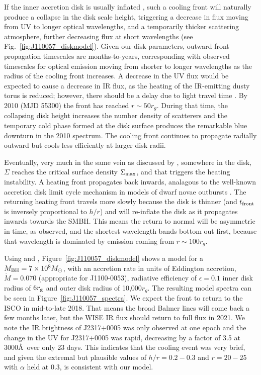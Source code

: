 \documentclass[a4paper,fleqn,usenatbib]{mnras}
\begin{document}
If the inner accretion disk is usually inflated \citet[see e.g.,
][]{Sirko_Goodman2003, Thompson2005, Hopkins_Quataert2011}, such a
cooling front will naturally produce a collapse in the disk scale
height, triggering a decrease in flux moving from UV to longer optical
wavelengths, and a temporarily thicker scattering atmosphere, further
decreasing flux at short wavelengths (see
Fig.~\ref{fig:J110057_diskmodel}).  Given our disk parameters, outward
front propagation timescales are months-to-years, corresponding with
observed timescales for optical emission moving from shorter to longer
wavelengths as the radius of the cooling front increases. A decrease
in the UV flux would be expected to cause a decrease in IR flux, as
the heating of the IR-emitting dusty torus is reduced; however, there
should be a delay due to light travel time \citet[e.g.,
][]{Jun2015}. By 2010 (MJD 55300) the front has reached $r\sim50
r_{g}$. During that time, the collapsing disk height increases the
number density of scatterers and the temporary cold phase formed at
the disk surface produces the remarkable blue downturn in the 2010
spectrum. The cooling front continues to propagate radially outward
but cools less efficiently at larger disk radii.

Eventually, very much in the same vein as discussed by
\citet{Hameury2009}, somewhere in the disk, $\Sigma$ reaches the
critical surface density $\Sigma_{\rm max}$, and that triggers the
heating instability. A heating front propagates back inwards,
analagous to the well-known accretion disk limit cycle mechanism in
models of dwarf novae outbursts \citep[e.g.,][]{Cannizzo1998}. The
returning heating front travels more slowly because the disk is
thinner (and $t_{\rm front}$ is inversely proportional to $h/r$) and
will re-inflate the disk as it propagates inwards towards the
SMBH. This means the return to normal will be asymmetric in time, as
observed, and the shortest wavelength bands bottom out first, because
that wavelength is dominated by emission coming from $r\sim100r_{g}$.

Using \citet{Ford2018} and \citet{Sirko_Goodman2003},
Figure~\ref{fig:J110057_diskmodel} shows a model for a $M_{\rm
BH}=7\times 10^{8} M_{\odot}$, with an accretion rate in units of
Eddington accretion, $\dot{M}=0.070$ (appropriate for J1100-0053),
radiative efficiency of $\epsilon=0.1$ inner disk radius of $6r_{\rm
g}$ and outer disk radius of 10,000$r_{g}$. The resulting model
spectra can be seen in Figure~\ref{fig:J110057_spectra}. We expect the
front to return to the ISCO in mid-to-late 2018. That means the broad
Balmer lines will come back a few months later, but the WISE IR flux
should return to full flux in 2021. We note the IR brightness of
J2317+0005 was only observed at one epoch and the change in the UV for
J2317+0005 was rapid, decreasing by a factor of 3.5 at 3000\AA\ over
only 23 days. This indicates that the cooling event was very brief,
and given the extremal but plausible values of $h/r = 0.2-0.3$ and
$r=20-25$ with $\alpha$ held at 0.3, is consistent with our model.
\end{document}
